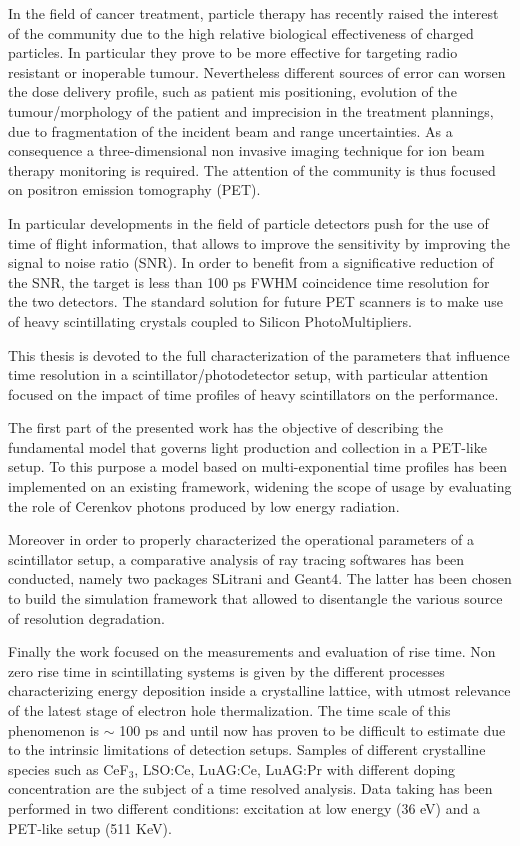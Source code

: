 \abstract

In the field of cancer treatment, particle therapy has recently raised the interest of the community due to the high relative biological effectiveness of charged particles.
In particular they prove to be more effective for targeting radio resistant or inoperable tumour.
Nevertheless different sources of error can worsen the dose delivery profile, such as patient mis positioning, evolution of the tumour/morphology of the patient and imprecision in the treatment plannings, due to fragmentation of the incident beam and range uncertainties.
As a consequence a three-dimensional non invasive imaging technique for ion beam therapy monitoring is required. The attention of the community is thus focused on positron emission tomography (PET).

In particular developments in the field of particle detectors push for the use of time of flight information, that allows to improve the sensitivity by improving the signal to noise ratio (SNR). 
In order to benefit from a significative reduction of the SNR, the target is less than 100 ps FWHM coincidence time resolution for the two detectors.
The standard solution for future PET scanners is to make use of heavy scintillating crystals coupled to Silicon PhotoMultipliers. 

This thesis is devoted to the full characterization of the parameters that influence time resolution in a scintillator/photodetector setup, with particular attention focused on the impact of time profiles of heavy scintillators on the performance.

The first part of the presented work has the objective of describing the fundamental model that governs light production and collection in a PET-like setup.
To this purpose a model based on multi-exponential time profiles has been implemented on an existing framework, widening the scope of usage by evaluating the role of Cerenkov photons produced by low energy radiation.

Moreover in order to properly characterized the operational parameters of a scintillator setup, a comparative analysis of ray tracing softwares has been conducted, namely two packages SLitrani and Geant4. The latter has been chosen to build the simulation framework that allowed to disentangle the various source of resolution degradation.

Finally the work focused on the measurements and evaluation of rise time. Non zero rise time in scintillating systems is given by the different processes characterizing energy deposition inside a crystalline lattice, with utmost relevance of the latest stage of electron hole thermalization. The time scale of this phenomenon is $\sim$ 100 ps and until now has proven to be difficult to estimate due to the intrinsic limitations of detection setups.
Samples of different crystalline species such as CeF$_{3}$, LSO:Ce, LuAG:Ce, LuAG:Pr with different doping concentration are the subject of a time resolved analysis. 
Data taking has been performed in two different conditions: excitation at low energy (36 eV) and a PET-like setup (511 KeV).

